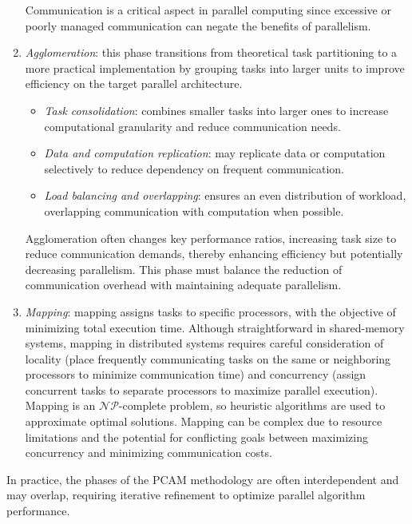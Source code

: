 \begin{enumerate}
        Communication is a critical aspect in parallel computing since excessive or poorly managed communication can negate the benefits of parallelism. 
    \item \textit{Agglomeration}: this phase transitions from theoretical task partitioning to a more practical implementation by grouping tasks into larger units to improve efficiency on the target parallel architecture.
        \begin{itemize}
            \item \textit{Task consolidation}: combines smaller tasks into larger ones to increase computational granularity and reduce communication needs.
            \item \textit{Data and computation replication}: may replicate data or computation selectively to reduce dependency on frequent communication.
            \item \textit{Load balancing and overlapping}: ensures an even distribution of workload, overlapping communication with computation when possible.
            
        \end{itemize}
        Agglomeration often changes key performance ratios, increasing task size to reduce communication demands, thereby enhancing efficiency but potentially decreasing parallelism. 
        This phase must balance the reduction of communication overhead with maintaining adequate parallelism.
    \item \textit{Mapping}: mapping assigns tasks to specific processors, with the objective of minimizing total execution time. 
        Although straightforward in shared-memory systems, mapping in distributed systems requires careful consideration of locality (place frequently communicating tasks on the same or neighboring processors to minimize communication time) and concurrency (assign concurrent tasks to separate processors to maximize parallel execution).
        Mapping is an $\mathcal{NP}$-complete problem, so heuristic algorithms are used to approximate optimal solutions.
        Mapping can be complex due to resource limitations and the potential for conflicting goals between maximizing concurrency and minimizing communication costs.
\end{enumerate}
In practice, the phases of the PCAM methodology are often interdependent and may overlap, requiring iterative refinement to optimize parallel algorithm performance.